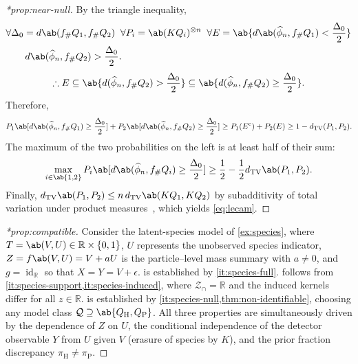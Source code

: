 \documentclass[12pt]{article}
\newcommand{\Herwig}{\mathrm{H}}
\newcommand{\Pythia}{\mathrm{P}}
\newcommand{\TV}{d_{\mathrm{TV}}}
\newcommand{\supp}{\mathcal{Z}_{\cap}}
\newcommand{\1}{\mathbbm{1}}
\newcommand{\pushf}[1]{#1_{\#}}
\renewcommand{\[}{\begin{equation}}
\renewcommand{\]}{\end{equation}}
\begin{document}
\begin{proof}[*prop:near-null] By the triangle inequality,
    \[
        \begin{split}
        &\forall \Delta_0 = d \ab(\pushf fQ_1,\pushf fQ_2)\;\; \forall P_i = \ab(KQ_i)^{\otimes n} \;\; \forall E = \ab\{ d \ab( \widehat\phi_n, \pushf fQ_1) < \frac{\Delta_0}2 \} \\
        &\qquad d\ab( \widehat\phi_n,\pushf fQ_2 ) >\frac{\Delta_0}2.
        \end{split}
    \]
    \[
            \therefore E \subseteq \ab\{ d(\widehat\phi_n, \pushf fQ_2) > \frac{\Delta_0}{2} \} \subseteq \ab\{ d(\widehat\phi_n, \pushf fQ_2) \ge \frac{\Delta_0}{2} \}.
        \]
        Therefore,
        \[
            P_1 \ab[d\ab(\widehat\phi_n,\pushf fQ_1) \ge \frac{\Delta_0}2] + P_2\ab[ d \ab( \widehat\phi_n,\pushf fQ_2) \ge \frac{\Delta_0}2] \ge P_1(E^{\mathrm c}) + P_2(E) \ge 1 - \TV(P_1, P_2).
        \]
        The maximum of the two probabilities on the left is at least half of their sum:
        \[
            \max_{i \in \ab\{1,2\}} P_i \ab[ d \ab( \widehat\phi_n, \pushf fQ_i) \ge \frac{\Delta_0}{2} ] \ge \frac12 - \frac12 \TV \ab(P_1, P_2).
        \]
        Finally, \(\TV \ab(P_1, P_2) \le n\,\TV \ab(KQ_1, KQ_2)\) by subadditivity of total variation under product measures~\cite{Tsybakov:2009}, which yields \cref{eq:lecam}.
    \end{proof}

\begin{proof}[*prop:compatible]
        Consider the latent-species model of \cref{ex:species}, where \(T = \ab(V, U) \in \mathbb R \times \{0, 1\}\), \(U\) represents the unobserved species indicator, \(Z = f\ab(V, U) = V + aU\) is the particle--level mass summary with \(a \ne 0\), and \(g = \operatorname{id}_{\mathbb R}\) so that \(X = Y = V + \epsilon\).
         is established by \cref{it:species-full}.
         follows from \cref{it:species-support,it:species-induced}, where \(\supp = \mathbb R\) and the induced kernels differ for all \(z \in \mathbb R\).
         is established by \cref{it:species-null,thm:non-identifiable}, choosing any model class \(\mathcal Q \supseteq \ab\{Q_\Herwig, Q_\Pythia\}\).
        All three properties are simultaneously driven by the dependence of \(Z\) on \(U\), the conditional independence of the detector observable \(Y\) from \(U\) given \(V\) (erasure of species by \(K\)), and the prior fraction discrepancy \(\pi_\Herwig \ne \pi_\Pythia\).
    \end{proof}
\end{document}
